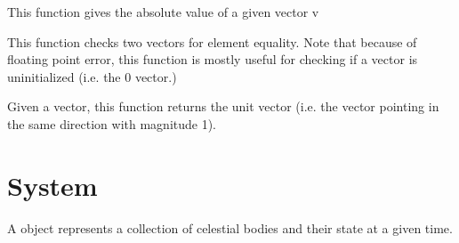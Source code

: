 \documentclass[letterpaper,10pt,english]{sphinxmanual}
\begin{document}
This function gives the absolute value of a given vector v

\begin{fulllineitems}
\label{\detokenize{vec3:c.vec3_eq}}
\end{fulllineitems}


This function checks two vectors for element equality. Note that because of floating point error, this function is mostly useful for checking if a vector is uninitialized (i.e. the 0 vector.)

\begin{fulllineitems}
\label{\detokenize{vec3:c.vec3_unit}}
\end{fulllineitems}


Given a vector, this function returns the unit vector (i.e. the vector pointing in the same direction with magnitude 1).


\chapter{System}
\label{\detokenize{system::doc}}\label{\detokenize{system:system}}

\begin{fulllineitems}
\label{\detokenize{system:c.System}}
\end{fulllineitems}


A  object represents a collection of celestial bodies and their state at a given time.

\begin{fulllineitems}
\label{\detokenize{system:c.System.bodies}}
\end{fulllineitems}
\end{document}
